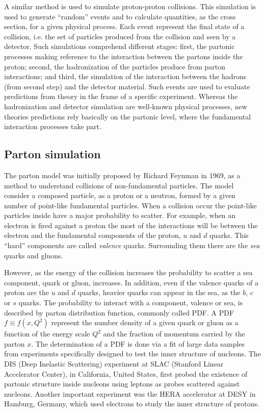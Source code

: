 A similar method is used to simulate proton-proton collisions. This simulation is used to generate ``random'' events and to calculate quantities, as the cross section, for a given physical process. Each event represent the final state of a collision, i.e. the set of particles produced from the collision and seen by a detector. Such simulations comprehend different stages: first, the partonic processes making reference to the interaction between the partons inside the proton; second, the hadronization of the particles produce from parton interactions; and third, the simulation of the interaction between the hadrons (from second step) and the detector material. Such events are used to evaluate predictions from theory in the frame of a specific experiment. Whereas the hadronization and detector simulation are well-known physical processes, new theories predictions rely basically on the partonic level, where the fundamental interaction processes take part.

\subsection{Parton simulation}
\label{sec:parton}

The parton model was initially proposed by Richard Feynman in 1969, as a method to understand collisions of non-fundamental particles. The model consider a composed particle, as a proton or a neutron, formed by a given number of point-like fundamental particles. When a collision occur the point-like particles inside have a major probability to scatter. For example, when an electron is fired against a proton the most of the interactions will be between the electron and the fundamental components of the proton, $u$ and $d$ quarks. This ``hard'' components are called \textit{valence} quarks. Surrounding them there are the \textit{sea} quarks and gluons.

However, as the energy of the collision increases the probability to scatter a sea component, quark or gluon, increases. In addition, even if the valence quarks of a proton are the $u$ and $d$ quarks, heavier quarks can appear in the sea, as the $b$, $c$ or $s$ quarks. The probability to interact with a component, valence or sea, is described by parton distribution function, commonly called PDF. A PDF $f\equiv f(x,Q^{2})$ represent the number density of a given quark or gluon as a function of the energy scale $Q^{2}$ and the fraction of momentum carried by the parton $x$. The determination of a PDF is done via a fit of large data samples from experiments specifically designed to test the inner structure of nucleons. The DIS (Deep Inelastic Scattering) experiment at SLAC (Stanford Linear Accelerator Center), in California, United States, first probed the existence of partonic structure inside nucleons using leptons as probes scattered against nucleons. Another important experiment was the HERA accelerator at DESY in Hamburg, Germany, which used electrons to study the inner structure of protons.

